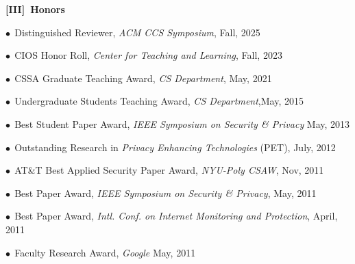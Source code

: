 \documentclass[11pt]{article}
\newcommand{\ignore}[1]{}
\newcommand{\alignboth}[2]{\noindent \parbox[t]{85pt} {\bf#1} \parbox[t]{400pt}{#2} \vspace{0.5\baselineskip} }
\newcommand{\alignright}[1]{\noindent \parbox[t]{85pt} {\hspace{79pt}} \parbox[t]{400pt}{#1} \vspace{0.5\baselineskip} }
\newcommand{\headingsgap}{\vspace{\baselineskip}}
\newcommand{\bibgap}{\vspace{0.3\baselineskip}}
\begin{document}
\headingsgap
\alignboth{[III]~Honors}{$\bullet\:\: $Distinguished Reviewer, {\it ACM CCS Symposium}, \hfill Fall, 2025\\}
\alignright{$\bullet\:\: $CIOS Honor Roll, {\it Center for Teaching and Learning}, \hfill Fall, 2023}
\alignright{$\bullet\:\:$CSSA Graduate Teaching Award, {\it CS Department}, \hfill May, 2021}
\alignright{$\bullet\:\: $Undergraduate Students Teaching Award, {\it CS Department},\hfill May, 2015}
\alignright{$\bullet\:\: $Best Student Paper Award, {\it IEEE Symposium on Security \& Privacy} \hfill May, 2013}
\alignright{$\bullet\:\: $Outstanding Research in {\it Privacy Enhancing Technologies} (PET), \hfill July, 2012}
\alignright{$\bullet\:\:$AT\&T Best Applied Security Paper Award, {\it NYU-Poly CSAW}, \hfill Nov, 2011}
\alignright{$\bullet\:\:$Best Paper Award, {\it IEEE Symposium on Security \& Privacy}, \hfill May, 2011}
\alignright{$\bullet\:\:$Best Paper Award, {\it Intl. Conf. on Internet Monitoring and Protection}, \hfill April, 2011}
\alignright{$\bullet\:\:$Faculty Research Award, {\it Google} \hfill May, 2011}
\ignore{
\bibgap
\alignright{$\bullet\:\:$Faculty Research Award, {\it Google} \hfill March, 2009}
\bibgap
\alignright{$\bullet\:\:$CAREER Award, {\it National Science Foundation}, \hfill February, 2006}
\bibgap
\alignright{$\bullet\:\:$Best Student Paper Award, {\it $8^{th}$ USENIX Security Symposium} \hfill August, 1999}
\bibgap
\alignright{$\bullet\:\:$Best Overall Paper Award, {\it $8^{th}$ USENIX Security Symposium} \hfill August, 1999}
\bibgap
\alignright{$\bullet\:\:$USENIX Scholars Research Award \hfill Fall 1998}
}

\end{document}
